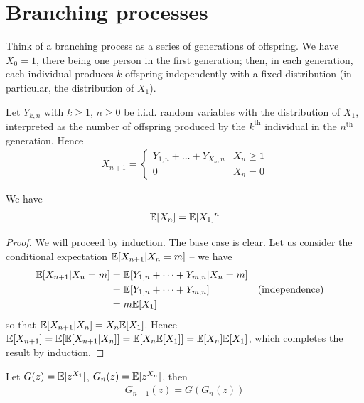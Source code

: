 \documentclass{../../template/note}
\begin{document}
    \section{Branching processes}
    
    Think of a branching process as a series of generations of offspring. We have \(X_0 = 1\), there being one person in the first generation; then, in each generation, each individual produces \(k\) offspring independently with a fixed distribution (in particular, the distribution of \(X_1\)).

    Let \(Y_{k,n}\) with \(k \geq 1\), \(n \geq 0\) be i.i.d. random variables with the distribution of \(X_1\), interpreted as the number of offspring produced by the \(k^\text{th}\) individual in the \(n^\text{th}\) generation. Hence
    \begin{align*}
        X_{n+1} = \begin{cases}
            Y_{1, n} + \dots + Y_{X_n, n} & X_n \geq 1 \\
            0 & X_n = 0
        \end{cases}
    \end{align*}
    
    \begin{proposition}
        \label{expected-branching}
        We have
        \begin{align*}
            \mathbb E[X_n] = \mathbb E[X_1]^n
        \end{align*}
    \end{proposition}
    
    \begin{proof}
        We will proceed by induction. The base case is clear. Let us consider the conditional expectation \(\mathbb E[X_{n+1} | X_n = m]\) -- we have
        \begin{align*}
            \mathbb E[X_{n+1} | X_n = m] &= \mathbb E[Y_{1,n} + \dots + Y_{m,n} | X_n = m] \\
            &= \mathbb E[Y_{1,n} + \dots + Y_{m,n}] && \text{(independence)} \\
            &= m\mathbb E[X_1]
        \end{align*}
        so that \(\mathbb E[X_{n+1} | X_n] = X_n\mathbb E[X_1]\). Hence \(\mathbb E[X_{n+1}] = \mathbb E[\mathbb E[X_{n+1} | X_n]] = \mathbb E[X_n\mathbb E[X_1]] = \mathbb E[X_n] \mathbb E[X_1]\), which completes the result by induction.        
    \end{proof}
    
    \begin{proposition}
        Let \(G(z) = \mathbb E[z^{X_1}]\), \(G_n(z) = \mathbb E[z^{X_n}]\), then
        \begin{align*}
            G_{n+1}(z) = G(G_n(z))
        \end{align*}
    \end{proposition}
    
\end{document}
